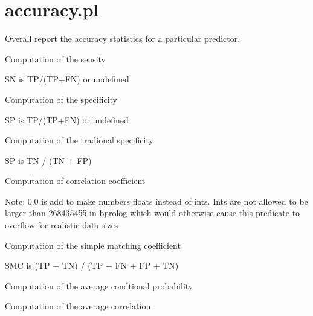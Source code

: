 


\section{accuracy.pl}

\label{sec:accuracy}

\begin{description}
Overall report the accuracy statistics for a particular predictor.

Computation of the sensity

\begin{code}
SN is TP/(TP+FN) or undefined
\end{code}

Computation of the specificity

\begin{code}
SP is TP/(TP+FN) or undefined
\end{code}

Computation of the tradional specificity

\begin{code}
SP is TN / (TN + FP)
\end{code}

Computation of correlation coefficient

Note: 0.0 is add to make numbers floats instead of ints.
Ints are not allowed to be larger than 268435455 in bprolog which
would otherwise cause this predicate to overflow for realistic data sizes

Computation of the simple matching coefficient

\begin{code}
SMC is (TP + TN) / (TP + FN + FP + TN)
\end{code}

Computation of the average condtional probability

Computation of the average correlation


\end{description}
